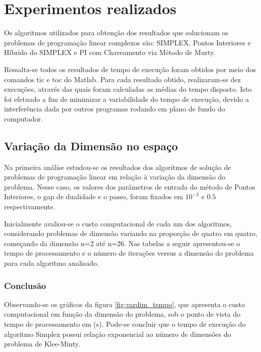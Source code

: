 \documentclass[11pt,a4paper]{article}
\begin{document}
 
\section{Experimentos realizados}

    Os algoritmos utilizados para obtenção dos resultados que solucionam os problemas de programação linear complexos são: SIMPLEX, Pontos Interiores e Híbrido do SIMPLEX e PI com Chaveamento via Método de Murty. 
    
    Ressalta-se todos os resultados de tempo de execução foram obtidos por meio dos comandos tic e toc do Matlab\textregistered. Para cada resultado obtido, realizaram-se dez execuções, através das quais foram calculadas as médias do tempo disposto. Isto foi efetuado a fim de minimizar a variabilidade do tempo de execução, devido a interferência dada por outros programas rodando em plano de fundo do computador.
    
    \subsection{Variação da Dimensão no espaço}
    
        Na primeira análise estudou-se os resultados dos algoritmos de solução de problemas de programação linear em relação à variação da dimensão do problema. Nesse caso, os valores dos parâmetros de entrada do método de Pontos Interiores, o gap de dualidade e o passo, foram fixados em $10^{-2}$ e $0.5$ respectivamente.  
        
        Inicialmente avaliou-se o custo computacional de cada um dos algoritmos, considerando problemas de dimensão variando na proporção de quatro em quatro, começando da dimensão n=2 até n=26. Nas tabelas a seguir apresentou-se o tempo de processamento e o número de iterações versus a dimensão do problema para cada algoritmo analisado.

        
    
        \subsubsection{Conclusão}

            Observando-se os gráficos da figura \ref{fig:vardim_tempo}, que apresenta o custo computacional em função da dimensão do problema, sob o ponto de vista do tempo de processamento em (s). Pode-se concluir que o tempo de execução do algoritmo Simplex possui relação exponencial ao número de dimensões do problema de Klee-Minty.
            
\end{document}
